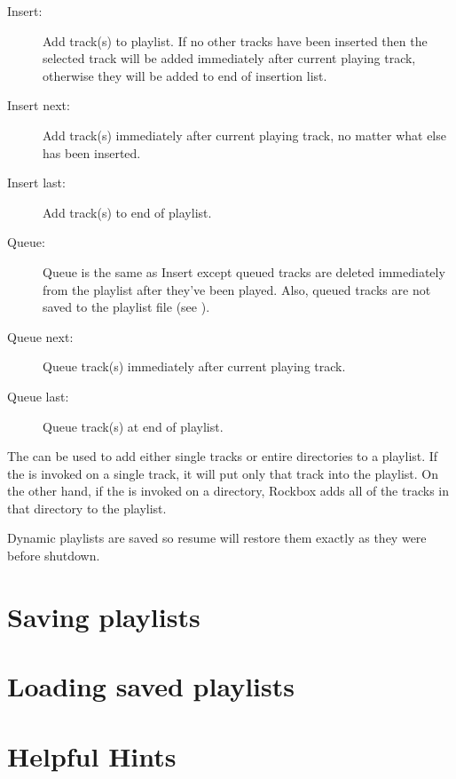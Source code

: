 \begin{description}
{	\begin{description} 
	
	\item [Insert:] Add track(s) to playlist. If no other 
	tracks have been inserted then the selected track will be added immediately 
	after current playing track, otherwise they will be added to end of insertion 
	list. 
	
	\item [Insert next:] Add track(s) immediately after current playing 
	track, no matter what else has been inserted. 
	
	\item [Insert last:] Add track(s) to end of playlist. 
	
	\item [Queue:] Queue is the same as Insert except queued tracks are deleted 
	immediately from the playlist after they've been played. Also, queued tracks 
	are not saved to the playlist file (see ). 
	
	\item [Queue next:] Queue track(s) immediately after current playing track. 
	
	\item [Queue last:] Queue track(s) at end of playlist. \end{description}

The  can be used to add either single tracks or 
entire directories to a playlist. If the  is 
invoked on a single track, it will put only that track into the playlist.  
On the other hand, if the  is invoked on a 
directory, Rockbox adds all of the tracks in that directory to the playlist.  

Dynamic playlists are saved so resume will restore them exactly as they were before
shutdown.

\section{Saving playlists}

\section{Loading saved playlists}

\section{Helpful Hints}

}
\end{description}
